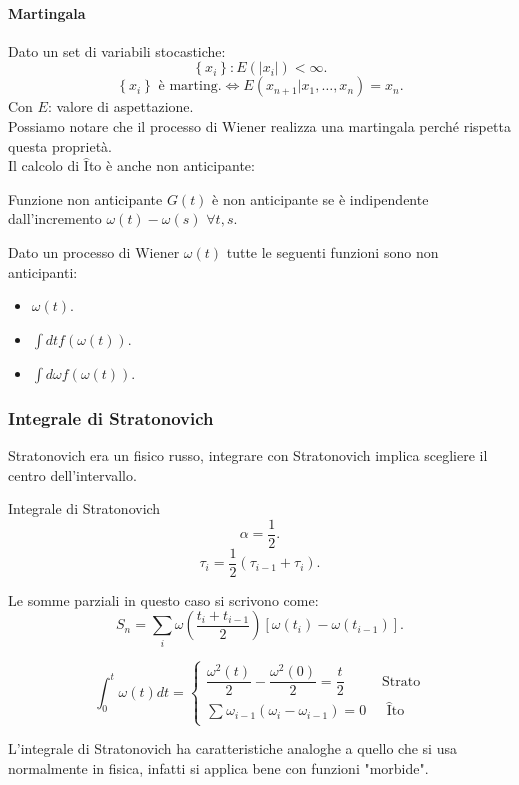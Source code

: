 \paragraph{Martingala}%
\label{par:Martingala}
Dato un set di variabili stocastiche:
\[
    \left\{x_i\right\}: E(\left|x_i\right|) < \infty
.\] 
\[
    \left\{x_i\right\} \text{ è marting.} \iff
    E(x_{n+1}|x_1,\ldots,x_n) = x_n
.\] 
Con $E$: valore di aspettazione.\\
Possiamo notare che il processo di Wiener realizza una martingala perché rispetta questa proprietà.\\
Il calcolo di $\hat{\text{I}}$to è anche non anticipante:
\begin{redbox}{Funzione non anticipante}
    $G(t)$ è non anticipante se è indipendente dall'incremento $\omega (t) - \omega (s) $ $\forall t, s$.
\end{redbox}
\noindent
\begin{exmp}
    Dato un processo di Wiener $\omega (t)$ tutte le seguenti funzioni sono non anticipanti:
    \begin{itemize}
	\item $\omega (t) $.
	\item $\int dt f(\omega (t) ) $.
	\item $\int d\omega f(\omega (t) ) $.
    \end{itemize}
\end{exmp}
\noindent
\subsubsection{Integrale di Stratonovich}%
\label{subsub:Integrale di Stratonovich}
Stratonovich era un fisico russo, integrare con Stratonovich implica scegliere il centro dell'intervallo.
\begin{bluebox}{Integrale di Stratonovich}
    \[
        \alpha = \frac{1}{2}
    .\] 
    \[
        \tau_i = \frac{1}{2}\left(\tau_{i-1}+ \tau_i\right)
    .\] 
\end{bluebox}
\noindent
Le somme parziali in questo caso si scrivono come:
\[
    S_n = \sum_{i}^{} \omega\left(\frac{t_i + t_{i-1}}{2}\right)\left[\omega (t_i) -\omega (t_{i-1}) \right]
.\] 
\begin{exmp}
    \[
	\int_{0}^{t} \omega (t) dt = 
	\begin{cases}
	    \dfrac{\omega^2(t)}{2}-\dfrac{\omega^2(0)}{2} = \dfrac{t}{2} & \text{ Strato}\\
	    \sum_{}^{} \omega_{i-1}\left(\omega_i-\omega_{i-1}\right) = 0 & \text{ }\hat{\text{I}}\text{to}
	\end{cases}
    \] 
\end{exmp}
\noindent
L'integrale di Stratonovich ha caratteristiche analoghe a quello che si usa normalmente in fisica, infatti si applica bene con funzioni "morbide".
